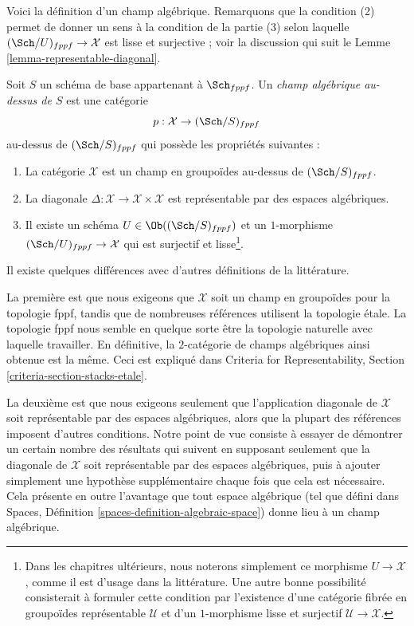 \noindent
Voici la définition d'un champ algébrique. Remarquons que la condition
(2) permet de donner un sens à la condition de la partie (3) selon laquelle
$(\Sch/U)_{fppf} \to \mathcal{X}$
est lisse et surjective ; voir la discussion qui suit le
Lemme \ref{lemma-representable-diagonal}.

\begin{definition}
\label{definition-algebraic-stack}
Soit $S$ un schéma de base appartenant à $\Sch_{fppf}$.
Un {\it champ algébrique au-dessus de $S$} est une catégorie
$$
p : \mathcal{X} \to (\Sch/S)_{fppf}
$$
au-dessus de $(\Sch/S)_{fppf}$ qui possède les propriétés suivantes :
\begin{enumerate}
\item La catégorie $\mathcal{X}$ est un champ en groupoïdes au-dessus de
$(\Sch/S)_{fppf}$.
\item La diagonale
$\Delta : \mathcal{X} \to \mathcal{X} \times \mathcal{X}$
est représentable par des espaces algébriques.
\item Il existe un schéma $U \in \Ob((\Sch/S)_{fppf})$
et un $1$-morphisme $(\Sch/U)_{fppf} \to \mathcal{X}$
qui est surjectif et lisse\footnote{Dans les chapitres ultérieurs, nous noterons
simplement ce morphisme $U \to \mathcal{X}$, comme il est d'usage dans la littérature. Une autre
bonne possibilité consisterait à formuler cette condition par l'existence d'une
catégorie fibrée en groupoïdes représentable $\mathcal{U}$ et d'un $1$-morphisme
lisse et surjectif $\mathcal{U} \to \mathcal{X}$.}.
\end{enumerate}
\end{definition}

\noindent
Il existe quelques différences avec d'autres définitions de la littérature.

\medskip\noindent
La première est que nous exigeons que $\mathcal{X}$ soit un champ en groupoïdes
pour la topologie fppf, tandis que de nombreuses références utilisent la topologie \'etale.
La topologie fppf nous semble en quelque sorte être la topologie naturelle
avec laquelle travailler. En définitive, la $2$-catégorie de champs algébriques
ainsi obtenue est la même. Ceci est expliqué dans
Criteria for Representability, Section \ref{criteria-section-stacks-etale}.

\medskip\noindent
La deuxième est que nous exigeons seulement que l'application diagonale de $\mathcal{X}$ soit
représentable par des espaces algébriques, alors que la plupart des références imposent d'autres
conditions. Notre point de vue consiste à essayer de démontrer un certain
nombre des résultats qui suivent en supposant seulement que la diagonale
de $\mathcal{X}$ soit représentable par des espaces algébriques, puis à ajouter simplement
une hypothèse supplémentaire chaque fois que cela est nécessaire. Cela présente en outre
l'avantage que tout espace algébrique (tel que défini dans
Spaces, Définition \ref{spaces-definition-algebraic-space})
donne lieu à un champ algébrique.

